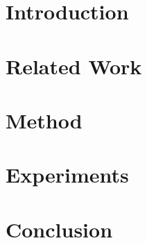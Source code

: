 \documentclass{article}
\title{}
\author{}
\date{}
\begin{document}
\maketitle

\begin{abstract}
\end{abstract}

\section{Introduction}

\section{Related Work}

\section{Method}

\section{Experiments}

\section{Conclusion}



\end{document}
